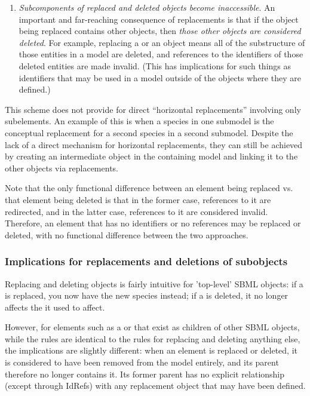 \begin{enumerate}
\item \emph{Subcomponents of replaced and deleted objects become inaccessible}.  An important and far-reaching consequence of replacements is that if the object being replaced contains other objects, then \emph{those other objects are considered deleted}.  For example, replacing a \Reaction or an \Event object means all of the substructure of those entities in a model are deleted, and references to the identifiers of those deleted entities are made invalid.  (This has implications for such things as \SpeciesReference identifiers that may be used in a model outside of the \Reaction objects where they are defined.)

\end{enumerate}

This scheme does not provide for direct ``horizontal replacements'' involving only subelements.  An example of this is when a species in one submodel is the conceptual replacement for a second species in a second submodel. Despite the lack of a direct mechanism for horizontal replacements, they can still be achieved by creating an intermediate object in the containing model and linking it to the other objects via replacements.

Note that the only functional difference between an element being replaced vs. that element being deleted is that in the former case, references to it are redirected, and in the latter case, references to it are  considered invalid.  Therefore, an element that has no identifiers or no references may be replaced or deleted, with no functional difference between the two approaches.

\subsubsection{Implications for replacements and deletions of subobjects}

Replacing and deleting objects is fairly intuitive for 'top-level' SBML objects: if a \Species is replaced, you now have the new species instead; if a \Reaction is deleted, it no longer affects the \Species it used to affect.

However, for elements such as a \KineticLaw or \SpeciesReference that exist as children of other SBML objects, while the rules are identical to the rules for replacing and deleting anything else, the implications are slightly different:  when an element is replaced or deleted, it is considered to have been removed from the model entirely, and its parent therefore no longer contains it.  Its former parent has no explicit relationship (except through IdRefs) with any replacement object that may have been defined. 

